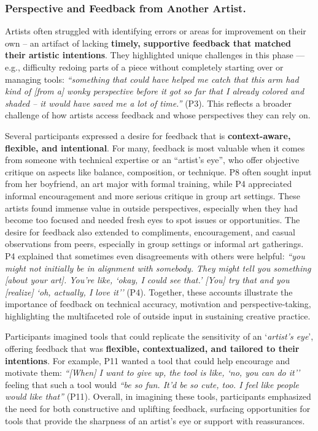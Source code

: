 \subsubsection{Perspective and Feedback from Another Artist.}
\label{feedback}

Artists often struggled with identifying errors or areas for improvement on their own -- an artifact of lacking \textbf{timely, supportive feedback that matched their artistic intentions}. They highlighted unique challenges in this phase --- e.g., difficulty redoing parts of a piece without completely starting over or managing tools: \textit{``something that could have helped me catch that this arm had kind of [from a] wonky perspective before it got so far that I already colored and shaded -- it would have saved me a lot of time.''} (P3). This reflects a broader challenge of how artists access feedback and whose perspectives they can rely on.

Several participants expressed a desire for feedback that is \textbf{context-aware, flexible, and intentional}. For many, feedback is most valuable when it comes from someone with technical expertise or an “artist’s eye”, who offer objective critique on aspects like balance, composition, or technique. P8 often sought input from her boyfriend, an art major with formal training, while P4 appreciated informal encouragement and more serious critique in group art settings. These artists found immense value in outside perspectives, especially when they had become too focused and needed fresh eyes to spot issues or opportunities. The desire for feedback also extended to compliments, encouragement, and casual observations from peers, especially in group settings or informal art gatherings. P4 explained that sometimes even disagreements with others were helpful: \textit{``you might not initially be in alignment with somebody. They might tell you something [about your art]. You're like, `okay, I could see that.' [You] try that and you [realize] `oh, actually, I love it''} (P4). Together, these accounts illustrate the importance of feedback on technical accuracy, motivation and perspective-taking, highlighting the multifaceted role of outside input in sustaining creative practice.


Participants imagined tools that could replicate the sensitivity of an ‘\textit{artist’s eye}’, offering feedback that was \textbf{flexible, contextualized, and tailored to their intentions}. For example, P11 wanted a tool that could help encourage and motivate them: \textit{``[When] I want to give up, the tool is like, `no, you can do it''} feeling that such a tool would \textit{``be so fun. It'd be so cute, too. I feel like people would like that''} (P11). Overall, in imagining these tools, participants emphasized the need for both constructive and uplifting feedback, surfacing opportunities for tools that provide the sharpness of an artist’s eye or support with reassurances.



